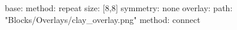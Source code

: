 base:
  method: repeat
  size: [8,8]
  symmetry: none
overlay:
  path: "Blocks/Overlays/clay_overlay.png"
  method: connect
